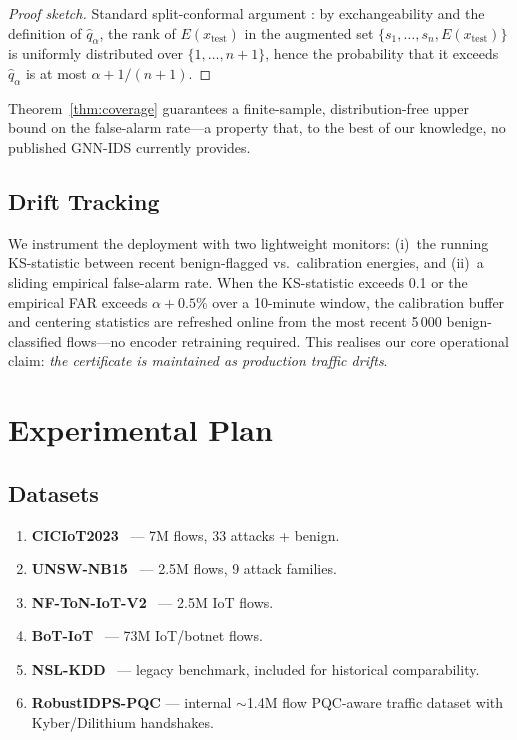 \documentclass[journal,twoside]{IEEEtran}
\begin{document}
\begin{proof}[Proof sketch]
  Standard split-conformal argument
  \cite{vovk2005,angelopoulos2023gentleconformal}: by exchangeability
  and the definition of $\hat{q}_\alpha$, the rank of $E(x_\text{test})$
  in the augmented set $\{s_1, \dots, s_n, E(x_\text{test})\}$ is
  uniformly distributed over $\{1, \dots, n{+}1\}$, hence the
  probability that it exceeds $\hat{q}_\alpha$ is at most
  $\alpha + 1/(n{+}1)$.
\end{proof}

\noindent
Theorem~\ref{thm:coverage} guarantees a finite-sample, distribution-free
upper bound on the false-alarm rate---a property that, to the best of our
knowledge, no published GNN-IDS currently provides.

\subsection{Drift Tracking}
We instrument the deployment with two lightweight monitors:
(i)~the running KS-statistic between recent
benign-flagged vs.\ calibration energies, and (ii)~a sliding empirical
false-alarm rate.  When the KS-statistic exceeds 0.1 or the empirical
FAR exceeds $\alpha + 0.5\%$ over a 10-minute window, the calibration
buffer and centering statistics are refreshed online from the most
recent 5\,000 benign-classified flows---no encoder retraining required.
This realises our core operational claim: \emph{the certificate is
maintained as production traffic drifts}.

\section{Experimental Plan}
\label{sec:experiments}

\subsection{Datasets}
\begin{enumerate}[leftmargin=1.5em]
  \item \textbf{CICIoT2023}~\cite{ciciot2023} — 7M flows, 33 attacks + benign.
  \item \textbf{UNSW-NB15}~\cite{moustafa2015unsw} — 2.5M flows, 9 attack families.
  \item \textbf{NF-ToN-IoT-V2}~\cite{sarhan2022nftoniot} — 2.5M IoT flows.
  \item \textbf{BoT-IoT}~\cite{koroniotis2019botiot} — 73M IoT/botnet flows.
  \item \textbf{NSL-KDD}~\cite{tavallaee2009nslkdd} — legacy benchmark, included
        for historical comparability.
  \item \textbf{RobustIDPS-PQC} — internal $\sim$1.4M flow PQC-aware traffic
        dataset with Kyber/Dilithium handshakes.
\end{enumerate}
\end{document}

